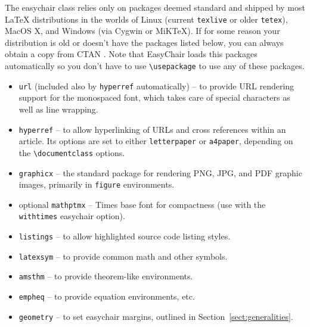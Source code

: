 \documentclass[EPiC]{easychair}
\newcommand{\easychair}{\textsf{easychair}}
\newcommand{\miktex}{MiK{\TeX}}
\begin{document}
The {\easychair} class relies only on packages deemed standard and shipped by
most {\LaTeX} distributions in the worlds of Linux (current \texttt{texlive} \cite{texlive}
or older \texttt{tetex}), MacOS X,
and Windows (via Cygwin or {\miktex}).
If for some reason your distribution is old or doesn't have the packages
listed below, you can always obtain a copy from CTAN \cite{ctan}. Note
that EasyChair loads this packages automatically so you don't have to
use \verb|\usepackage| to use any of these packages.

\begin{itemize}
\item
\texttt{url} \cite{url-package} (included also by \texttt{hyperref} automatically) -- to provide URL rendering support for the
monospaced font, which takes care of special characters as well as line 
wrapping.

\item
\texttt{hyperref} \cite{hyperref-package} -- to allow hyperlinking of URLs and
cross references within an article.
Its options are set to either \verb+letterpaper+ or \verb+a4paper+, depending
on the \verb+\documentclass+ options.

\item
\texttt{graphicx} \cite{graphicx-package} -- the standard package for rendering
PNG, JPG, and PDF graphic images, primarily in \texttt{figure} environments.

\item
optional \texttt{mathptmx} \cite{mathptmx-package} -- Times base font for compactness
(use with the \texttt{withtimes} {\easychair} option).

\item
\texttt{listings} \cite{listings-package} -- to allow highlighted source code 
listing styles.

\item
\texttt{latexsym} \cite{latexsym-package} -- to provide common math and other 
symbols.

\item
\texttt{amsthm} \cite{amsthm-package} -- to provide {\AmS} theorem-like 
environments.

\item
\texttt{empheq} \cite{empheq-package} -- to provide equation environments, etc.

\item
\texttt{geometry} \cite{geometry-package} -- to set {\easychair} margins, 
outlined in Section~\ref{sect:generalities}.


\end{itemize}
\end{document}

